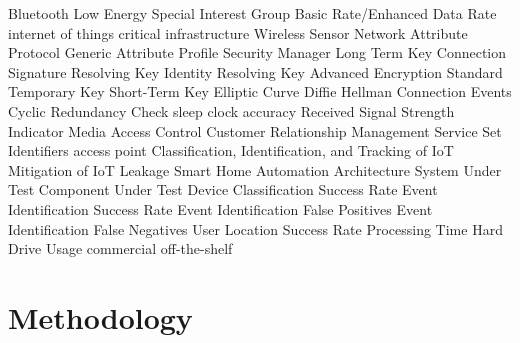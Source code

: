 \documentclass[12pt,letterpaper,oneside]{book}
\begin{document}
	\begin{acronym}
		 {Bluetooth Low Energy}
		 {Special Interest Group}
		 {Basic Rate/Enhanced Data Rate}
		 {internet of things}
		 {critical infrastructure}
		 {Wireless Sensor Network}
		 {Attribute Protocol}
		 {Generic Attribute Profile}
		 {Security Manager}
		 {Long Term Key}
		 {Connection Signature Resolving Key}
		 {Identity Resolving Key}
		 {Advanced Encryption Standard}
		 {Temporary Key}
		 {Short-Term Key}
		 {Elliptic Curve Diffie Hellman}
		 {Connection Events}
		 {Cyclic Redundancy Check}
		 {sleep clock accuracy}
		 {Received Signal Strength Indicator}
		 {Media Access Control}
		 {Customer Relationship Management}
		 {Service Set Identifiers}
		 {access point}
		 {Classification, Identification, and Tracking of \ac{IoT}}
		 {Mitigation of \ac{IoT} Leakage}
		 {Smart Home Automation Architecture}
		 {System Under Test}
		 {Component Under Test}
		 {Device Classification Success Rate}
		 {Event Identification Success Rate}
		 {Event Identification False Positives}
		 {Event Identification False Negatives}
		 {User Location Success Rate}
		 {Processing Time}
		 {Hard Drive Usage}
		 {commercial off-the-shelf}
	\end{acronym}
\mainmatter
	\chapter{Methodology}
\end{document}
